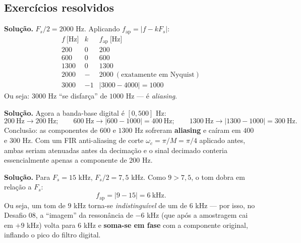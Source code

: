 \subsection*{Exercícios resolvidos}


\textbf{Solução.} $F_s/2=2000$ Hz. Aplicando
$f_{\text{ap}}=|f-kF_s|$:
\[
  \begin{array}{c|c|c}
    f\ \text{[Hz]} & k & f_{\text{ap}}\ \text{[Hz]}\\ \hline
    200  & 0 & 200\\
    600  & 0 & 600\\
    1300 & 0 & 1300\\
    2000 & - & 2000\ (\text{exatamente em Nyquist})\\
    3000 & -1 & |3000-4000|=1000
  \end{array}
\]
Ou seja: $3000$ Hz ``se disfarça'' de $1000$ Hz — é \emph{aliasing}.



\textbf{Solução.} Agora a banda-base digital é $[0,500]$ Hz:
\[
  200\ \text{Hz}\to200\ \text{Hz};\qquad
  600\ \text{Hz}\to|600-1000|=400\ \text{Hz};\qquad
  1300\ \text{Hz}\to|1300-1000|=300\ \text{Hz}.
\]
Conclusão: as componentes de $600$ e $1300$ Hz sofreram \textbf{aliasing} e
caíram em $400$ e $300$ Hz. Com um FIR anti-aliasing de corte
$\omega_c=\pi/M=\pi/4$ aplicado antes, ambas seriam atenuadas antes da
decimação e o sinal decimado conteria essencialmente apenas a componente de
$200$ Hz.



\textbf{Solução.} Para $F_s=15$ kHz, $F_s/2=7{,}5$ kHz. Como
$9>7{,}5$, o tom dobra em relação a $F_s$:
\[
  f_{\text{ap}}=|9-15|=6\ \text{kHz}.
\]
Ou seja, um tom de $9$ kHz torna-se \emph{indistinguível} de um de $6$ kHz —
por isso, no Desafio 08, a ``imagem'' da ressonância de $-6$ kHz (que após a
amostragem cai em $+9$ kHz) volta para $6$ kHz e \textbf{soma-se em fase} com
a componente original, inflando o pico do filtro digital.

